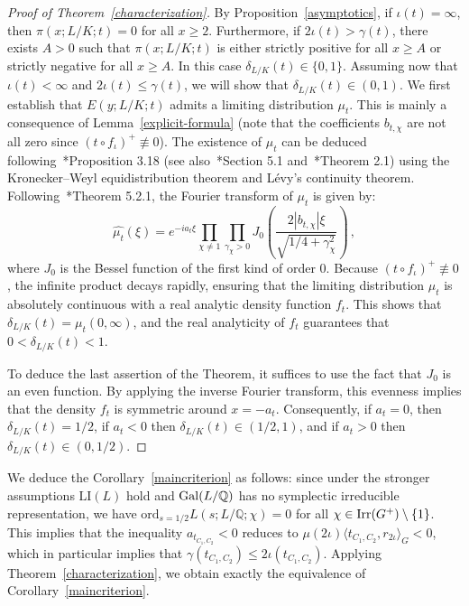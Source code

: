 \documentclass[12pt]{amsart}
\numberwithin{equation}{section}
\newcommand{\Gal}{{\rm Gal}}
\newcommand{\Q}{\mathbb Q}
\newcommand{\Irr}{{\rm Irr}}
\theoremstyle{definition}
\theoremstyle{remark}
\begin{document}
\begin{proof}[Proof of Theorem~\ref{characterization}]
    By Proposition~\ref{asymptotics}, if $\iota(t)=\infty$, then $\pi(x;L/K;t)=0$ for all $x\ge 2$. Furthermore, if $2\iota(t)>\gamma(t)$, there exists $A>0$ such that $\pi(x;L/K;t)$ is either strictly positive for all $x\ge A$ or strictly negative for all $x\ge A$. In this case $\delta_{L/K}(t)\in \{0,1\}$. Assuming now that $\iota(t)<\infty$ and $2\iota(t)\le \gamma(t)$, we will show that $\delta_{L/K}(t)\in (0,1)$. We first establish that $E(y;L/K;t)$ admits a limiting distribution $\mu_t$. This is mainly a consequence of Lemma~\ref{explicit-formula} (note that the coefficients $b_{t,\chi}$ are not all zero since $(t\circ f_\iota)^+\not \equiv 0$). The existence of $\mu_t$ can be deduced following~\cite{FJ}*{Proposition 3.18} (see also~\cite{Ng}*{Section 5.1} and~\cite{Dev}*{Theorem 2.1}) using the Kronecker--Weyl equidistribution theorem and Lévy's continuity theorem. Following~\cite{Ng}*{Theorem 5.2.1}, the Fourier transform of $\mu_t$ is given by:
    \[ \widehat{\mu_t}(\xi) = e^{-i a_t \xi} \prod_{\chi \ne 1} \prod_{\gamma_\chi > 0} J_0\left( \frac{2 |b_{t,\chi}| \xi}{\sqrt{1/4 + \gamma_\chi^2}} \right)\, ,\]
    where $J_0$ is the Bessel function of the first kind of order 0. Because $(t \circ f_\iota)^+ \not\equiv 0$, the infinite product decays rapidly, ensuring that the limiting distribution $\mu_t$ is absolutely continuous with a real analytic density function $f_t$. This shows that $\delta_{L/K}(t)=\mu_t(0,\infty)$, and the real analyticity of $f_t$ guarantees that $0 < \delta_{L/K}(t) < 1$.
    
    To deduce the last assertion of the Theorem, it suffices to use the fact that $J_0$ is an even function. By applying the inverse Fourier transform, this evenness implies that the density $f_t$ is symmetric around $x=-a_t$. Consequently, if $a_t=0$, then $\delta_{L/K}(t)=1/2$, if $a_t<0$ then $\delta_{L/K}(t)\in(1/2,1)$, and if $a_t>0$ then $\delta_{L/K}(t)\in (0,1/2)$.
\end{proof}
We deduce the Corollary~\ref{maincriterion} as follows: since under the stronger assumptions $\mathrm{LI}(L)$ hold and $\Gal(L/\Q)$ has no symplectic irreducible representation, we have $\mathrm{ord}_{s=1/2}L(s;L/\Q;\chi)=0$ for all $\chi \in \Irr(G^+)\setminus \{1\}$. This implies that the inequality $a_{t_{C_1,C_2}}<0$ reduces to $\mu(2\iota)\langle t_{C_1,C_2},r_{2\iota}\rangle_G<0$, which in particular implies that $\gamma(t_{C_1,C_2})\le 2\iota(t_{C_1,C_2})$. Applying Theorem~\ref{characterization}, we obtain exactly the equivalence of Corollary~\ref{maincriterion}.
\end{document}
